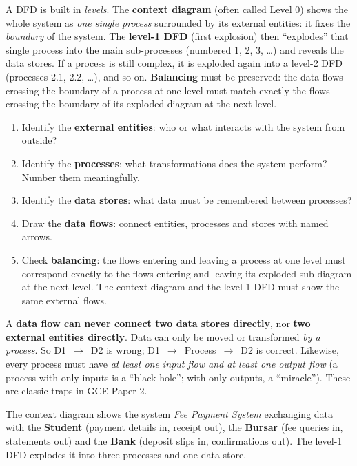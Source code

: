 \documentclass[11pt]{article}
\begin{document}
A DFD is built in \emph{levels}. The \textbf{context diagram} (often called Level 0) shows the whole system as \emph{one single process} surrounded by its external entities: it fixes the \emph{boundary} of the system. The \textbf{level-1 DFD} (first explosion) then ``explodes'' that single process into the main sub-processes (numbered 1, 2, 3, \dots) and reveals the data stores. If a process is still complex, it is exploded again into a level-2 DFD (processes 2.1, 2.2, \dots), and so on. \textbf{Balancing} must be preserved: the data flows crossing the boundary of a process at one level must match exactly the flows crossing the boundary of its exploded diagram at the next level.

\begin{methode}
\begin{enumerate}
\item Identify the \textbf{external entities}: who or what interacts with the system from outside?
\item Identify the \textbf{processes}: what transformations does the system perform? Number them meaningfully.
\item Identify the \textbf{data stores}: what data must be remembered between processes?
\item Draw the \textbf{data flows}: connect entities, processes and stores with named arrows.
\item Check \textbf{balancing}: the flows entering and leaving a process at one level must correspond exactly to the flows entering and leaving its exploded sub-diagram at the next level. The context diagram and the level-1 DFD must show the same external flows.
\end{enumerate}
\end{methode}

\begin{attention}
A \textbf{data flow can never connect two data stores directly}, nor \textbf{two external entities directly}. Data can only be moved or transformed \emph{by a process}. So D1~$\to$~D2 is wrong; D1~$\to$~Process~$\to$~D2 is correct. Likewise, every process must have \emph{at least one input flow and at least one output flow} (a process with only inputs is a ``black hole''; with only outputs, a ``miracle''). These are classic traps in GCE Paper 2.
\end{attention}

\begin{exemplebox}
The context diagram shows the system \emph{Fee Payment System} exchanging data with the \textbf{Student} (payment details in, receipt out), the \textbf{Bursar} (fee queries in, statements out) and the \textbf{Bank} (deposit slips in, confirmations out). The level-1 DFD explodes it into three processes and one data store.
\end{exemplebox}
\end{document}
